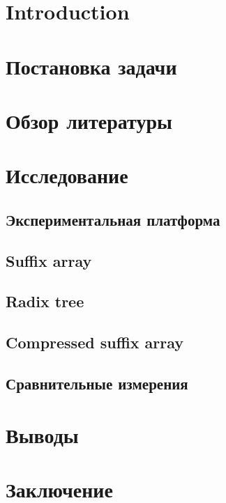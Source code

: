 \newpage
\tableofcontents
\newpage

\section{Introduction}


\newpage
\section{Постановка задачи}


\newpage
\section{Обзор литературы}


\newpage
\section{Исследование}


\newpage
\subsection{Экспериментальная платформа}


\newpage
\subsection{Suffix array}


\newpage
\subsection{Radix tree}


\newpage
\subsection{Compressed suffix array}


\newpage
\subsection{Сравнительные измерения}


\newpage
\section{Выводы}


\newpage
\section{Заключение}


\newpage



